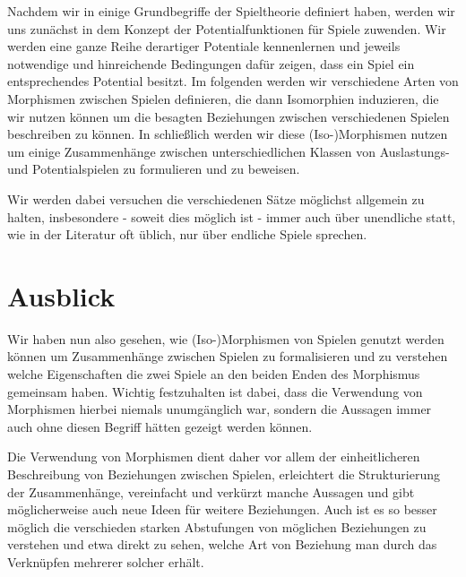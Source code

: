 \documentclass[a4paper,ngerman,11pt,bibliography=totoc]{scrartcl}
\theoremstyle{definition}
\theoremstyle{plain}
\theoremstyle{remark}
\begin{document}
Nachdem wir in  einige Grundbegriffe der Spieltheorie definiert haben, werden wir uns zunächst in  dem Konzept der Potentialfunktionen für Spiele zuwenden. Wir werden eine ganze Reihe derartiger Potentiale kennenlernen und jeweils notwendige und hinreichende Bedingungen dafür zeigen, dass ein Spiel ein entsprechendes Potential besitzt. Im folgenden  werden wir verschiedene Arten von Morphismen zwischen Spielen definieren, die dann Isomorphien induzieren, die wir nutzen können um die besagten Beziehungen zwischen verschiedenen Spielen beschreiben zu können. In  schließlich werden wir diese (Iso-)Morphismen nutzen um einige Zusammenhänge zwischen unterschiedlichen Klassen von Auslastungs- und Potentialspielen zu formulieren und zu beweisen.

Wir werden dabei versuchen die verschiedenen Sätze möglichst allgemein zu halten, insbesondere - soweit dies möglich ist - immer auch über unendliche statt, wie in der Literatur oft üblich, nur über endliche Spiele sprechen.






{}
\section*{Ausblick}

Wir haben nun also gesehen, wie (Iso-)Morphismen von Spielen genutzt werden können um Zusammenhänge zwischen Spielen zu formalisieren und zu verstehen welche Eigenschaften die zwei Spiele an den beiden Enden des Morphismus gemeinsam haben. Wichtig festzuhalten ist dabei, dass die Verwendung von Morphismen hierbei niemals unumgänglich war, sondern die Aussagen immer auch ohne diesen Begriff hätten gezeigt werden können. 

Die Verwendung von Morphismen dient daher vor allem der einheitlicheren Beschreibung von Beziehungen zwischen Spielen, erleichtert die Strukturierung der Zusammenhänge, vereinfacht und verkürzt manche Aussagen und gibt möglicherweise auch neue Ideen für weitere Beziehungen. Auch ist es so besser möglich die verschieden starken Abstufungen von möglichen Beziehungen zu verstehen und etwa direkt zu sehen, welche Art von Beziehung man durch das Verknüpfen mehrerer solcher erhält.



\newpage
\nocite{*}
\printbibliography
\end{document}
